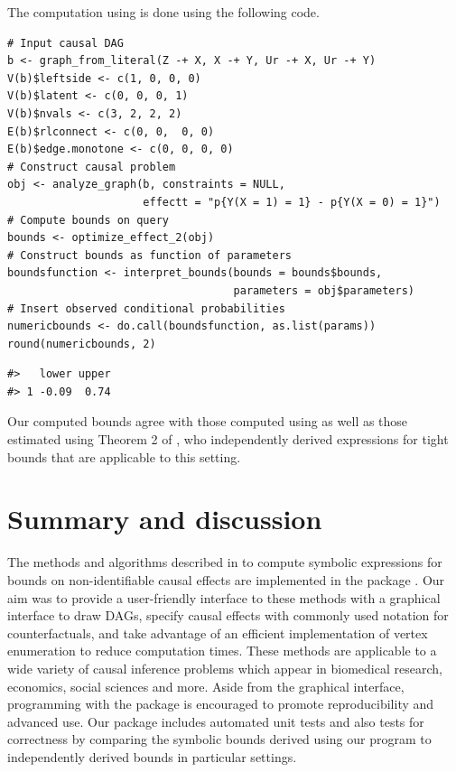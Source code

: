 The computation using  is done using the following code.

\begin{verbatim}
# Input causal DAG
b <- graph_from_literal(Z -+ X, X -+ Y, Ur -+ X, Ur -+ Y)
V(b)$leftside <- c(1, 0, 0, 0)
V(b)$latent <- c(0, 0, 0, 1)
V(b)$nvals <- c(3, 2, 2, 2)
E(b)$rlconnect <- c(0, 0,  0, 0)
E(b)$edge.monotone <- c(0, 0, 0, 0)
# Construct causal problem
obj <- analyze_graph(b, constraints = NULL, 
                     effectt = "p{Y(X = 1) = 1} - p{Y(X = 0) = 1}")
# Compute bounds on query
bounds <- optimize_effect_2(obj)
# Construct bounds as function of parameters
boundsfunction <- interpret_bounds(bounds = bounds$bounds, 
                                   parameters = obj$parameters)
# Insert observed conditional probabilities
numericbounds <- do.call(boundsfunction, as.list(params))
round(numericbounds, 2)
\end{verbatim}

\begin{verbatim}
#>   lower upper
#> 1 -0.09  0.74
\end{verbatim}

Our computed bounds agree with those computed using  as well as those estimated using Theorem 2 of \citet{richardson2014ace}, who independently derived expressions for tight bounds that are applicable to this setting.

\hypertarget{summary-and-discussion}{%
\section{Summary and discussion}\label{summary-and-discussion}}

The methods and algorithms described in \citet{generalcausalbounds} to compute symbolic expressions for bounds on non-identifiable causal effects are implemented in the package . Our aim was to provide a user-friendly interface to these methods with a graphical interface to draw DAGs, specify causal effects with commonly used notation for counterfactuals, and take advantage of an efficient implementation of vertex enumeration to reduce computation times. These methods are applicable to a wide variety of causal inference problems which appear in biomedical research, economics, social sciences and more. Aside from the graphical interface, programming with the package is encouraged to promote reproducibility and advanced use. Our package includes automated unit tests and also tests for correctness by comparing the symbolic bounds derived using our program to independently derived bounds in particular settings.

